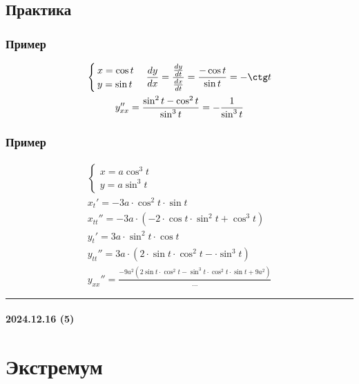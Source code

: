 \documentclass{article}
\begin{document}
\subsection{Практика}

\subsubsection{Пример}
\begin{gather*}
    \begin{cases}
        x = \cos t \\
        y = \sin t
    \end{cases}
    \frac{dy}{dx} = 
    \frac{\frac{dy}{dt}}{\frac{dx}{dt}} = 
    \frac{-\cos t}{\sin t} = 
    -\ctg t \\
    y_{xx}'' = \frac{\sin^2 t - \cos^2 t}{\sin^3 t} = -\frac{1}{\sin^3 t}
\end{gather*}


\subsubsection{Пример}
\begin{gather*}
    \begin{cases}
        x = a \cos^3 t \\
        y = a \sin^3 t
    \end{cases} \\
    x_t'     = -3a \cdot \cos^2 t \cdot \sin t \\
    x_{tt}'' = -3a \cdot \left( -2 \cdot \cos t \cdot \sin^2 t + \cos^3 t \right) \\
    y_t'     = 3a \cdot \sin^2 t \cdot \cos t \\
    y_{tt}'' = 3a \cdot \left( 2 \cdot \sin t \cdot \cos^2 t - \cdot \sin^3 t \right) \\
    y_{xx}'' = \frac{-9a^2 \left( 2 \sin t \cdot \cos^2 t - \sin^3 t \cdot \cos^2 t  \cdot \sin t + 9a^2\right)}{...}
\end{gather*}



\par\noindent\rule{\textwidth}{1pt}
\paragraph{2024.12.16 (5)}
\section{Экстремум}
\end{document}
